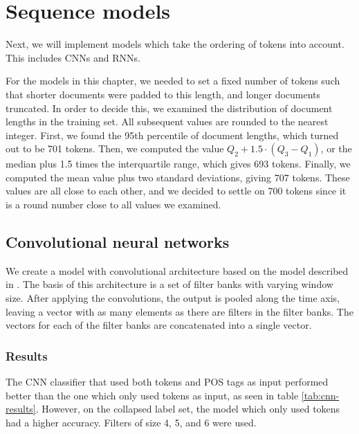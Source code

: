 \chapter{Sequence models}

Next, we will implement models which take the ordering of tokens into
account. This includes \acp{CNN} and \acp{RNN}.

For the models in this chapter, we needed to set a fixed number of tokens
such that shorter documents were padded to this length, and longer documents
truncated. In order to decide this, we examined the distribution of document
lengths in the training set. All subsequent values are rounded to the nearest
integer. First, we found the 95th percentile of document lengths, which
turned out to be 701 tokens. Then, we computed the value $Q_2 + 1.5 \cdot
(Q_3 - Q_1)$, or the median plus 1.5 times the interquartile range, which
gives 693 tokens. Finally, we computed the mean value plus two standard
deviations, giving 707 tokens. These values are all close to each other, and
we decided to settle on 700 tokens since it is a round number close to all
values we examined.


\section{Convolutional neural networks}

We create a model with convolutional architecture based on the model
described in \textcite{zhang2017sensitivity}. The basis of this architecture
is a set of filter banks with varying window size. After applying the
convolutions, the output is pooled along the time axis, leaving a vector with
as many elements as there are filters in the filter banks. The vectors for
each of the filter banks are concatenated into a single vector.


\subsection{Results}

The \ac{CNN} classifier that used both tokens and POS tags as input performed
better than the one which only used tokens as input, as seen in table
\ref{tab:cnn-results}. However, on the collapsed label set, the model which only
used tokens had a higher accuracy. Filters of size 4, 5, and 6 were used.

